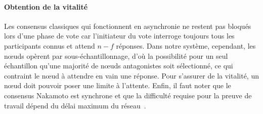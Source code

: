 \documentclass[letterpaper,twocolumn,10pt]{article}
\newcommand{\editinsert}[1]{{\color{blue}#1}}
\theoremstyle{definition}
\begin{document}
\paragraph{Obtention de la vitalité} %
Les consensus classiques qui fonctionnent en asynchronie ne restent pas bloqués lors d'une phase de vote car l'initiateur du vote interroge toujours tous les participants connus et attend $n - f$ réponses.
Dans notre système, cependant, les nœuds opèrent par sous-échantillonnage, d'où la possibilité pour un seul échantillon qu'une majorité de nœuds antagonistes soit sélectionné, ce qui contraint le nœud à attendre en vain une réponse. Pour s'assurer de la vitalité, un nœud doit pouvoir poser une limite à l'attente. Enfin, il faut noter que le consensus Nakamoto est synchrone et que la difficulté requise pour la preuve de travail dépend du délai maximum du réseau~\cite{PassSS17}. 

\end{document}

